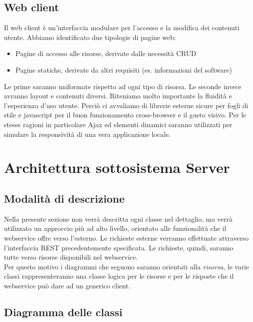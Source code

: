 \subsection{Web client}
Il web client è un'interfaccia modulare per l'accesso e la modifica dei contenuti utente. Abbiamo identificato due tipologie di pagine web:

\begin{itemize}
\item Pagine di accesso alle risorse, derivate dalle necessità CRUD
\item Pagine statiche, derivate da altri requisiti (es. informazioni del software)
\end{itemize}

Le prime saranno uniformate rispetto ad ogni tipo di risorsa. Le seconde invece avranno layout e contenuti diversi. Riteniamo molto importante la fluidità e l'esperienza d'uso utente. Perciò ci avvaliamo di librerie esterne sicure per fogli di stile e javascript per il buon funzionamento cross-browser e il gusto visivo. Per le stesse ragioni in particolare Ajax ed elementi dinamici saranno utilizzati per simulare la responsività di una vera applicazione locale.

\section{Architettura sottosistema Server}

\subsection{Modalità di descrizione}
Nella presente sezione non verrà descritta ogni classe nel dettaglio, ma verrà utilizzato un approccio più ad alto livello, orientato alle funzionalità che il webservice offre verso l'esterno.
Le richieste esterne verranno effettuate attraverso l'interfaccia REST precedentemente specificata. Le richieste, quindi, saranno tutte verso risorse disponibili nel webservice. \\
Per questo motivo i diagrammi che seguono saranno orientati alla \emph{risorsa}, le varie classi rappresenteranno una classe logica per le risorse e per le risposte che il webservice può dare ad un generico client.

\subsection{Diagramma delle classi}

